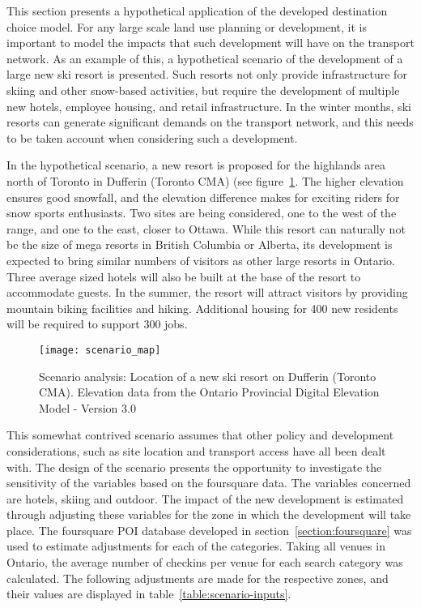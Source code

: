 This section presents a hypothetical application of the developed destination choice model. For any large scale land use planning or development, it is important to model the impacts that such development will have on the transport network. As an example of this, a hypothetical scenario of the development of a large new ski resort is presented. Such resorts not only provide infrastructure for skiing and other snow-based activities, but require the development of multiple new hotels, employee housing, and retail infrastructure. In the winter months, ski resorts can generate significant demands on the transport network, and this needs to be taken account when considering such a development.

In the hypothetical scenario, a new resort is proposed for the highlands area north of Toronto  in Dufferin (Toronto CMA) (see figure~\ref{fig:scenario-map}. The higher elevation ensures good snowfall, and the elevation difference makes for exciting riders for snow sports enthusiasts. Two sites are being considered, one to the west of the range, and one to the east, closer to Ottawa. While this resort can naturally not be the size of mega resorts in British Columbia or Alberta, its development is expected to bring similar numbers of visitors as other large resorts in Ontario. Three average sized hotels will also be built at the base of the resort to accommodate guests. In the summer, the resort will attract visitors by providing mountain biking facilities and hiking. Additional housing for 400 new residents will be required to support 300 jobs.

\begin{figure}[H]
\centering
\texttt{[image: scenario\_map]}
\caption{Scenario analysis: Location of a new ski resort on Dufferin (Toronto CMA). Elevation data from the Ontario Provincial Digital Elevation Model - Version 3.0 }
\label{fig:scenario-map}
\end{figure}

This somewhat contrived scenario assumes that other policy and development considerations, such as site location and transport access have all been dealt with. The design of the scenario presents the opportunity to investigate the sensitivity of the  variables based on the foursquare data. The variables concerned are hotels, skiing and outdoor. The impact of the new development is estimated through adjusting these variables for the zone in which the development will take place. The foursquare POI database developed in section~\ref{section:foursquare} was used to estimate adjustments for each of the categories. Taking all venues in Ontario, the average number of checkins per venue for each search category was calculated. The following adjustments are made for the respective zones, and their values are displayed in table~\ref{table:scenario-inputs}.

